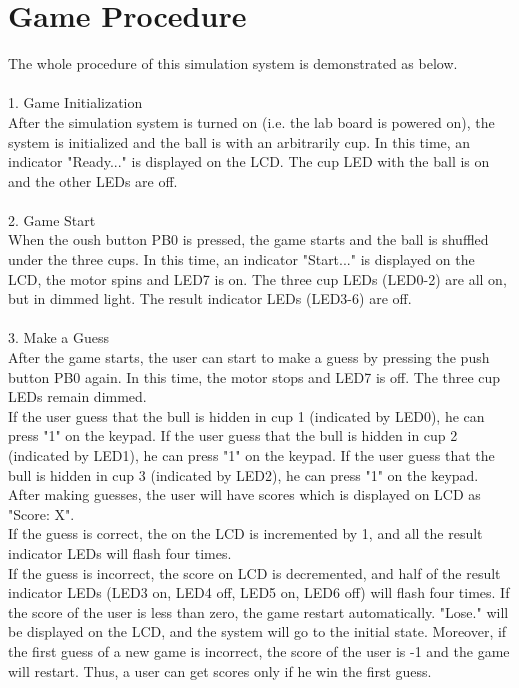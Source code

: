 \documentclass[a4paper, 12 pt]{report}
\begin{document}
\newpage
\section{Game Procedure}
The whole procedure of this simulation system is demonstrated as below.\\
\\
1. Game Initialization\\
After the simulation system is turned on (i.e. the lab board is powered on), the system is initialized and the ball is with an arbitrarily cup. In this time, an indicator "Ready..." is displayed on the LCD. The cup LED with the ball is on and the other LEDs are off.\\
\\
2. Game Start\\
When the oush button PB0 is pressed, the game starts and the ball is shuffled under the three cups. In this time, an indicator "Start..." is displayed on the LCD, the motor spins and LED7 is on. The three cup LEDs (LED0-2) are all on, but in dimmed light. The result indicator LEDs (LED3-6)  are off.\\
\\
3. Make a Guess\\
After the game starts, the user can start to make a guess by pressing the push button PB0 again. In this time, the motor stops and LED7 is off. The three cup LEDs remain dimmed.\\
If the user guess that the bull is hidden in cup 1 (indicated by LED0), he can press "1" on the keypad. If the user guess that the bull is hidden in cup 2 (indicated by LED1), he can press "1" on the keypad. If the user guess that the bull is hidden in cup 3 (indicated by LED2), he can press "1" on the keypad. After making guesses, the user will have scores which is displayed on LCD as "Score: X".\\
If the guess is correct, the on the LCD is incremented by 1, and all the result indicator LEDs will flash four times.\\
If the guess is incorrect, the score on LCD is decremented, and half of the result indicator LEDs (LED3 on, LED4 off, LED5 on, LED6 off) will flash four times. If the score of the user is less than zero, the game restart automatically. "Lose." will be displayed on the LCD, and the system will go to the initial state. Moreover, if the first guess of a new game is incorrect, the score of the user is -1 and the game will restart. Thus, a user can get scores only if he win the first guess.\\
\end{document}

